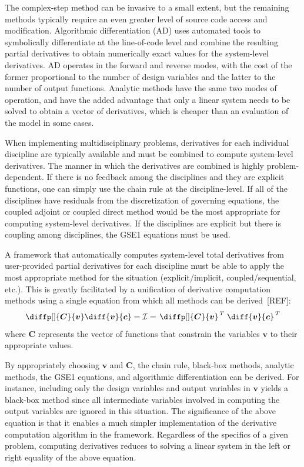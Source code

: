 \documentclass[]{aiaa-tc} %
\begin{document}
	The complex-step method can be invasive to a small extent, but the remaining methods typically require an even greater level of source code access and modification.
	Algorithmic differentiation (AD) uses automated tools to symbolically differentiate at the line-of-code level and combine the resulting partial derivatives to obtain numerically exact values for the system-level derivatives.
	AD operates in the forward and reverse modes, with the cost of the former proportional to the number of design variables and the latter to the number of output functions.
	Analytic methods have the same two modes of operation, and have the added advantage that only a linear system needs to be solved to obtain a vector of derivatives, which is cheaper than an evaluation of the model in some cases.
	
	When implementing multidisciplinary problems, derivatives for each individual discipline are typically available and must be combined to compute system-level derivatives.
	The manner in which the derivatives are combined is highly problem-dependent.
	If there is no feedback among the disciplines and they are explicit functions, one can simply use the chain rule at the discipline-level.
	If all of the disciplines have residuals from the discretization of governing equations, the coupled adjoint or coupled direct method would be the most appropriate for computing system-level derivatives.
	If the disciplines are explicit but there is coupling among disciplines, the GSE1 equations must be used.
	
	A framework that automatically computes system-level total derivatives from user-provided partial derivatives for each discipline must be able to apply the most appropriate method for the situation (explicit/implicit, coupled/sequential, etc.).
	This is greatly facilitated by a unification of derivative computation methods using a single equation from which all methods can be derived~[REF]:
	\begin{equation}
		\diffp[]{\bm C}{\bm v} \diff{\bm v}{\bm c} = \mathcal{\bm I} = \left. \diffp[]{\bm C}{\bm v} \right.^T \left. \diff{\bm v}{\bm c} \right.^T
	\end{equation}
	where $\bm C$ represents the vector of functions that constrain the variables $\bm v$ to their appropriate values.
	
	By appropriately choosing $\bm v$ and $\bm C$, the chain rule, black-box methods, analytic methods, the GSE1 equations, and algorithmic differentiation can be derived.
	For instance, including only the design variables and output variables in $\bm v$ yields a black-box method since all intermediate variables involved in computing the output variables are ignored in this situation.
	The significance of the above equation is that it enables a much simpler implementation of the derivative computation algorithm in the framework.
	Regardless of the specifics of a given problem, computing derivatives reduces to solving a linear system in the left or right equality of the above equation.
\end{document}
